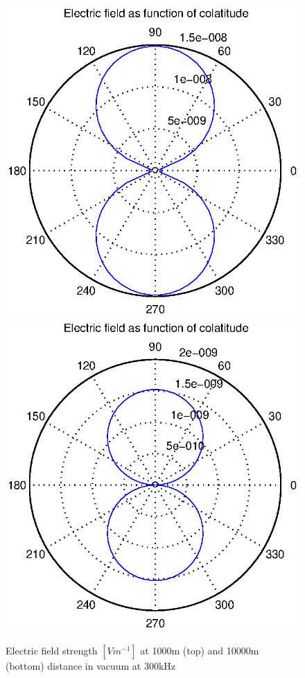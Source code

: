 \documentclass[a4paper,11pt]{thesis}
\begin{document}
\begin{figure}
\begin{center}
  \includegraphics[width=11.5cm]{DissPics/NFvac1000m300kHz.eps}
 \includegraphics[width=11.5cm]{DissPics/NFvac10000m300kHz.eps}
  \caption{Electric field strength $[Vm^{-1}]$ at 1000m (top) and 10000m (bottom) distance in vacuum at 300kHz}\label{figNFvac1000m300kHz}
  \end{center}
\end{figure}
\end{document}
